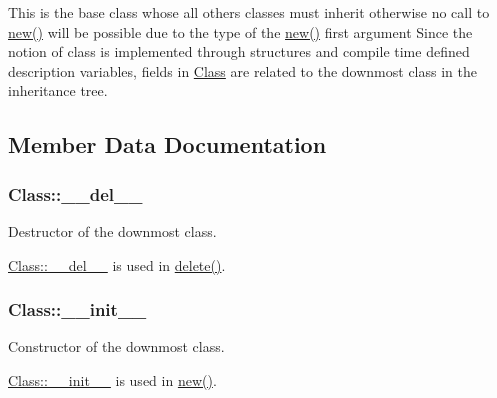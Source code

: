 This is the base class whose all others classes must inherit otherwise no call to \hyperlink{new_8c_a01e9717d9b65b0549d34b2c983800872}{new()} will be possible due to the type of the \hyperlink{new_8c_a01e9717d9b65b0549d34b2c983800872}{new()} first argument Since the notion of class is implemented through structures and compile time defined description variables, fields in \hyperlink{structClass}{Class} are related to the downmost class in the inheritance tree. 

\subsection{Member Data Documentation}
\subsubsection[{\texorpdfstring{\+\_\+\+\_\+del\+\_\+\+\_\+}{\_\_del\_\_}}]{ Class\+::\+\_\+\+\_\+del\+\_\+\+\_\+}\hypertarget{structClass_a2203173ad2d2705449a29b868097c28e}{}\label{structClass_a2203173ad2d2705449a29b868097c28e}


Destructor of the downmost class. 

\hyperlink{structClass_a2203173ad2d2705449a29b868097c28e}{Class\+::\+\_\+\+\_\+del\+\_\+\+\_\+} is used in \hyperlink{new_8c_ac33d98389953013a8fb7dacc6a4dc01d}{delete()}. 
\subsubsection[{\texorpdfstring{\+\_\+\+\_\+init\+\_\+\+\_\+}{\_\_init\_\_}}]{ Class\+::\+\_\+\+\_\+init\+\_\+\+\_\+}\hypertarget{structClass_a078235c167b0b3b3b8cb0f9f83e5cb82}{}\label{structClass_a078235c167b0b3b3b8cb0f9f83e5cb82}


Constructor of the downmost class. 

\hyperlink{structClass_a078235c167b0b3b3b8cb0f9f83e5cb82}{Class\+::\+\_\+\+\_\+init\+\_\+\+\_\+} is used in \hyperlink{new_8c_a01e9717d9b65b0549d34b2c983800872}{new()}. 
